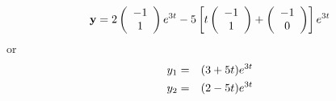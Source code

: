 \documentclass[12pt]{article}
\begin{document}
{\begin{enumerate}
\begin{equation}
{\bf y}=2\left(\begin{array}{c}-1\\ 1\end{array}\right)
e^{3 t}-5\left[
t\left(\begin{array}{c}-1\\ 1\end{array}\right)
+\left(\begin{array}{c}-1\\ 0\end{array}\right)
\right]e^{3 t}
\end{equation}
or
\begin{eqnarray}
y_1&=&(3+5t)e^{3t}\cr
y_2&=&(2-5t)e^{3t}
\end{eqnarray}
\end{enumerate}
}
\end{document}
